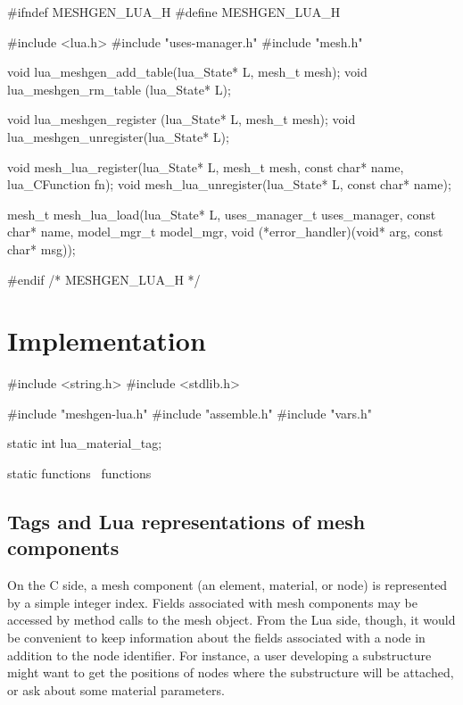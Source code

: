 \endmoddef
#ifndef MESHGEN_LUA_H
#define MESHGEN_LUA_H

#include <lua.h>
#include "uses-manager.h"
#include "mesh.h"

void lua_meshgen_add_table(lua_State* L, mesh_t mesh);
void lua_meshgen_rm_table (lua_State* L);

void lua_meshgen_register  (lua_State* L, mesh_t mesh);
void lua_meshgen_unregister(lua_State* L);

void mesh_lua_register(lua_State* L, mesh_t mesh, 
                       const char* name, lua_CFunction fn);
void mesh_lua_unregister(lua_State* L, const char* name);

mesh_t mesh_lua_load(lua_State* L, 
                     uses_manager_t uses_manager, const char* name,
                     model_mgr_t model_mgr,
                     void (*error_handler)(void* arg, const char* msg));

#endif /* MESHGEN_LUA_H */
\nwendcode{}\nwdocspar


\section{Implementation}

\nwenddocs{}\endmoddef
#include <string.h>
#include <stdlib.h>

#include "meshgen-lua.h"
#include "assemble.h"
#include "vars.h"

static int lua_material_tag;

\LA{}static functions~{\nwtagstyle{}}\RA{}
\LA{}functions~{\nwtagstyle{}}\RA{}
\nwendcode{}\nwdocspar


\subsection{Tags and Lua representations of mesh components}

On the C side, a mesh component (an element, material, or node)
is represented by a simple integer index.  Fields associated with
mesh components may be accessed by method calls to the mesh
object.  From the Lua side, though, it would be convenient to
keep information about the fields associated with a node in addition
to the node identifier.  For instance, a user developing a substructure
might want to get the positions of nodes where the substructure will
be attached, or ask about some material parameters.

